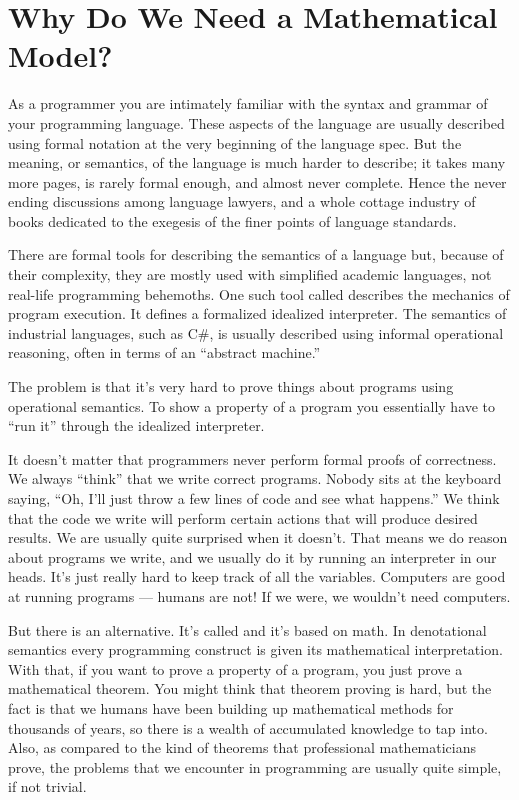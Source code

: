 \section{Why Do We Need a Mathematical Model?}

As a programmer you are intimately familiar with the syntax and grammar
of your programming language. These aspects of the language are usually
described using formal notation at the very beginning of the language
spec. But the meaning, or semantics, of the language is much harder to
describe; it takes many more pages, is rarely formal enough, and almost
never complete. Hence the never ending discussions among language
lawyers, and a whole cottage industry of books dedicated to the exegesis
of the finer points of language standards.

There are formal tools for describing the semantics of a language but,
because of their complexity, they are mostly used with simplified
academic languages, not real-life programming behemoths. One such tool
called  describes the mechanics of program
execution. It defines a formalized idealized interpreter. The semantics
of industrial languages, such as C\#, is usually described using
informal operational reasoning, often in terms of an ``abstract
machine.''

The problem is that it's very hard to prove things about programs using
operational semantics. To show a property of a program you essentially
have to ``run it'' through the idealized interpreter.

It doesn't matter that programmers never perform formal proofs of
correctness. We always ``think'' that we write correct programs. Nobody
sits at the keyboard saying, ``Oh, I'll just throw a few lines of code
and see what happens.'' We think that the code we write will perform
certain actions that will produce desired results. We are usually quite
surprised when it doesn't. That means we do reason about programs we
write, and we usually do it by running an interpreter in our heads. It's
just really hard to keep track of all the variables. Computers are good
at running programs --- humans are not! If we were, we wouldn't need
computers.

But there is an alternative. It's called 
and it's based on math. In denotational semantics every programming
construct is given its mathematical interpretation. With that, if you
want to prove a property of a program, you just prove a mathematical
theorem. You might think that theorem proving is hard, but the fact is
that we humans have been building up mathematical methods for thousands
of years, so there is a wealth of accumulated knowledge to tap into.
Also, as compared to the kind of theorems that professional
mathematicians prove, the problems that we encounter in programming are
usually quite simple, if not trivial.

